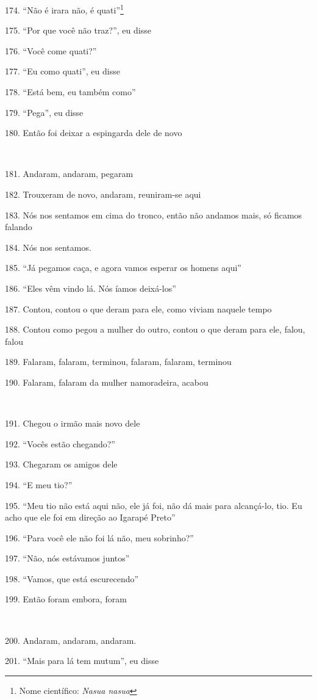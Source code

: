 174. ``Não é irara não, é quati''\footnote{Nome científico: \emph{Nasua
  nasua}}

175. ``Por que você não traz?'', eu disse

176. ``Você come quati?''

177. ``Eu como quati'', eu disse

178. ``Está bem, eu também como''

179. ``Pega'', eu disse

180. Então foi deixar a espingarda dele de novo

~

181. Andaram, andaram, pegaram

182. Trouxeram de novo, andaram, reuniram-se aqui

183. Nós nos sentamos em cima do tronco, então não andamos mais, só
ficamos falando

184. Nós nos sentamos.

185. ``Já pegamos caça, e agora vamos esperar os homens aqui''

186. ``Eles vêm vindo lá. Nós íamos deixá-los''

187. Contou, contou o que deram para ele, como viviam naquele tempo

188. Contou como pegou a mulher do outro, contou o que deram para ele,
falou, falou

189. Falaram, falaram, terminou, falaram, falaram, terminou

190. Falaram, falaram da mulher namoradeira, acabou

~

191. Chegou o irmão mais novo dele

192. ``Vocês estão chegando?''

193. Chegaram os amigos dele

194. ``E meu tio?''

195. ``Meu tio não está aqui não, ele já foi, não dá mais para
alcançá-lo, tio. Eu acho que ele foi em direção ao Igarapé Preto''

196. ``Para você ele não foi lá não, meu sobrinho?''

197. ``Não, nós estávamos juntos''

198. ``Vamos, que está escurecendo''

199. Então foram embora, foram

~

200. Andaram, andaram, andaram.

201. ``Mais para lá tem mutum'', eu disse

